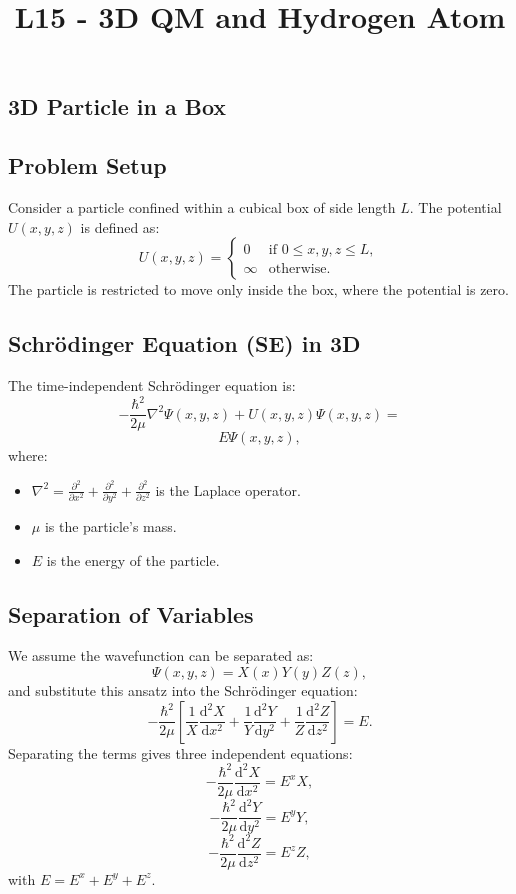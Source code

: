 \documentclass[a4paper,12pt]{article}
\begin{document}
\title{\textbf{L15 - 3D QM and Hydrogen Atom}}
\author{}
\date{}
\maketitle
\begin{multicols}{2}

\section*{3D Particle in a Box}
\subsection*{Problem Setup}
Consider a particle confined within a cubical box of side length \( L \). The potential \( U(x,y,z) \) is defined as:
\[
U(x,y,z) =
\begin{cases} 
0 & \text{if } 0 \leq x, y, z \leq L, \\
\infty & \text{otherwise}.
\end{cases}
\]
The particle is restricted to move only inside the box, where the potential is zero.

\subsection*{Schrödinger Equation (SE) in 3D}
The time-independent Schrödinger equation is:
\[
-\frac{\hbar^2}{2\mu} \nabla^2 \Psi(x,y,z) + U(x,y,z)\Psi(x,y,z) = 
\]
\[
E \Psi(x,y,z),
\]
where:
\begin{itemize}
    \item \( \nabla^2 = \frac{\partial^2}{\partial x^2} + \frac{\partial^2}{\partial y^2} + \frac{\partial^2}{\partial z^2} \) is the Laplace operator.
    \item \( \mu \) is the particle's mass.
    \item \( E \) is the energy of the particle.
\end{itemize}

\subsection*{Separation of Variables}
We assume the wavefunction can be separated as:
\[
\Psi(x,y,z) = X(x) Y(y) Z(z),
\]
and substitute this ansatz into the Schrödinger equation:
\[
-\frac{\hbar^2}{2\mu} \left[ \frac{1}{X} \frac{\mathrm{d}^2 X}{\mathrm{d}x^2} + \frac{1}{Y} \frac{\mathrm{d}^2 Y}{\mathrm{d}y^2} + \frac{1}{Z} \frac{\mathrm{d}^2 Z}{\mathrm{d}z^2} \right] = E.
\]
Separating the terms gives three independent equations:
\[
-\frac{\hbar^2}{2\mu} \frac{\mathrm{d}^2 X}{\mathrm{d}x^2} = E^x X, 
\]
\[
-\frac{\hbar^2}{2\mu} \frac{\mathrm{d}^2 Y}{\mathrm{d}y^2} = E^y Y, 
\]
\[
-\frac{\hbar^2}{2\mu} \frac{\mathrm{d}^2 Z}{\mathrm{d}z^2} = E^z Z,
\]
with \( E = E^x + E^y + E^z \).


\end{multicols}
\end{document}
